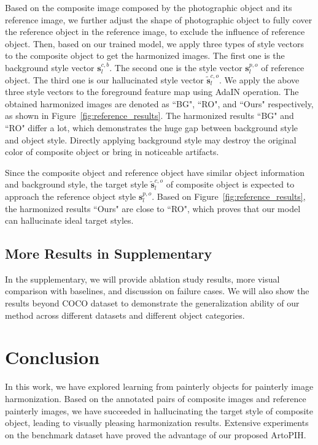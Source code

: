 \documentclass[letterpaper]{article} %
\begin{document}
Based on the composite image composed by the photographic object and its reference image, we further adjust the shape of photographic object to fully cover the reference object in the reference image, to exclude the influence of reference object. Then, based on our trained model, we apply three types of style vectors to the composite object to get the harmonized images.
The first one is the background style vector $\bm{s}_l^{c,b}$. The second one is the style vector $\bm{s}_l^{p,o}$ of reference object. The third one is our hallucinated style vector $\tilde{\bm{s}}_l^{c,o}$. We apply the above three style vectors to the foreground feature map using AdaIN operation. The obtained harmonized images are denoted as ``BG", ``RO", and ``Ours" respectively, as shown in Figure~\ref{fig:reference_results}.
The harmonized results ``BG" and ``RO" differ a lot, which demonstrates the huge gap between background style and object style. Directly applying background style may destroy the original color of composite object or bring in noticeable artifacts.

Since the composite object and reference object have similar object information and background style, the target style $\tilde{\bm{s}}_l^{c,o}$ of composite object is expected to approach the reference object style $\bm{s}_l^{p,o}$. Based on Figure~\ref{fig:reference_results},  the harmonized results ``Ours" are close to ``RO", which proves that our model can hallucinate ideal target styles.

\subsection{More Results in Supplementary}

In the supplementary, we will provide ablation study results, more visual comparison with baselines, and discussion on failure cases. We will also show the results beyond COCO \cite{lin2014microsoft} dataset to demonstrate the generalization ability of our method across different datasets and different object categories.

\section{Conclusion}
In this work, we have explored learning from painterly objects for painterly image harmonization. Based on the annotated pairs of composite images and reference painterly images, we have succeeded in hallucinating the target style of composite object, leading to visually pleasing harmonization results. Extensive experiments on the benchmark dataset have proved the advantage of our proposed ArtoPIH.
\end{document}
